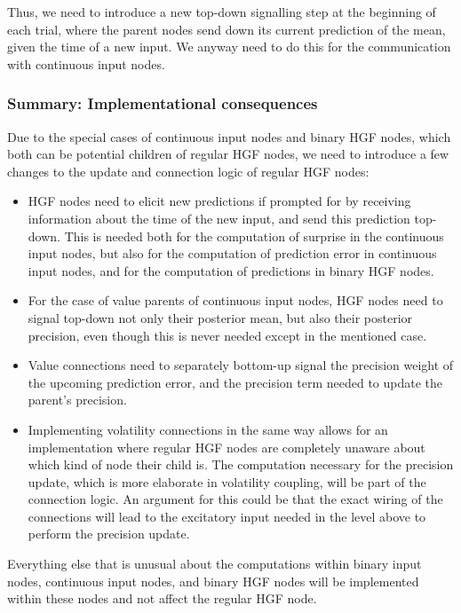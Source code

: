 Thus, we need to introduce a new top-down signalling step at the beginning of each trial, where the parent nodes send down its current prediction of the mean, given the time of a new input. We anyway need to do this for the communication with continuous input nodes. \\

\subsubsection{Summary: Implementational consequences}
Due to the special cases of continuous input nodes and binary HGF nodes, which both can be potential children of regular HGF nodes, we need to introduce a few changes to the update and connection logic of regular HGF nodes:
\begin{itemize}
    \item HGF nodes need to elicit new predictions if prompted for by receiving information about the time of the new input, and send this prediction top-down. This is needed both for the computation of surprise in the continuous input nodes, but also for the computation of prediction error in continuous input nodes, and for the computation of predictions in binary HGF nodes.
    \item For the case of value parents of continuous input nodes, HGF nodes need to signal top-down not only their posterior mean, but also their posterior precision, even though this is never needed except in the mentioned case.
    \item Value connections need to separately bottom-up signal the precision weight of the upcoming prediction error, and the precision term needed to update the parent's precision.
    \item Implementing volatility connections in the same way allows for an implementation where regular HGF nodes are completely unaware about which kind of node their child is. The computation necessary for the precision update, which is more elaborate in volatility coupling, will be part of the connection logic. An argument for this could be that the exact wiring of the connections will lead to the excitatory input needed in the level above to perform the precision update.
\end{itemize}

Everything else that is unusual about the computations within binary input nodes, continuous input nodes, and binary HGF nodes will be implemented within these nodes and not affect the regular HGF node.

